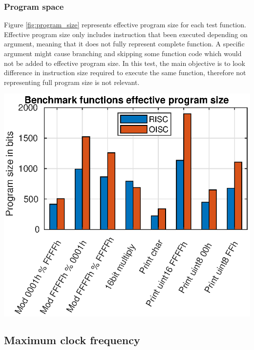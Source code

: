\subsubsection{Program space}

Figure \ref{fig:program_size} represents effective program size for each test function. Effective program size only includes instruction that been executed depending on argument, meaning that it does not fully represent complete function. A specific argument might cause branching and skipping some function code which would not be added to effective program size. In this test, the main objective is to look difference in instruction size required to execute the same function, therefore not representing full program size is not relevant. 
\begin{colfigure}
	\centering
	\includegraphics[width=\linewidth]{../tests/program_size.eps}
	\label{fig:program_size}
\end{colfigure}

\subsection{Maximum clock frequency}

\subsection{}
